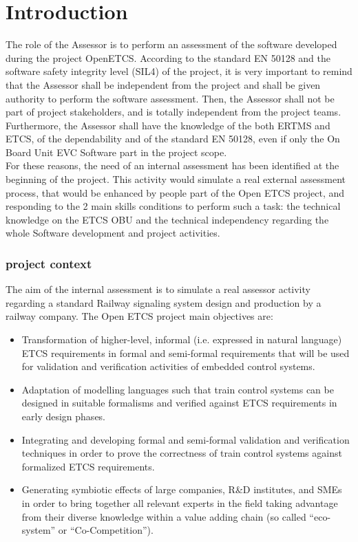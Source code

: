 \documentclass{template/openetcs_report}
\begin{document}

\chapter{Introduction}
The role of the Assessor is to perform an assessment of the software developed during the project OpenETCS. According to the standard EN 50128 and the software safety integrity level (SIL4) of the project, it is very important to remind that the Assessor shall be independent from the project and shall be given authority to perform the software assessment. Then, the Assessor shall not be part of project stakeholders, and is totally independent from the project teams. Furthermore, the Assessor shall have the knowledge of the both ERTMS and ETCS, of the dependability and of the standard EN 50128, even if only the On Board Unit EVC Software part in the project scope.
\\
For these reasons, the need of an internal assessment has been identified at the beginning of the project. This activity would simulate a real external assessment process, that would be  enhanced by people part of the Open ETCS project, and responding to the 2 main skills conditions to perform such a task: the technical knowledge on the ETCS OBU and the technical independency regarding the whole Software development and project activities. 

\subsection{project context}
The aim of the internal assessment is to simulate a real assessor activity regarding a standard Railway signaling system design and production by a railway company. The Open ETCS project main objectives are:
\begin{itemize}
\item Transformation of higher-level, informal (i.e. expressed in natural language) ETCS requirements in formal and semi-formal requirements that will be used for validation and verification activities of embedded control systems.
\item Adaptation of modelling languages such that train control systems can be designed in suitable formalisms and verified against ETCS requirements in early design phases.
\item Integrating and developing formal and semi-formal validation and verification techniques in order to prove the correctness of train control systems against formalized ETCS requirements.
\item Generating symbiotic effects of large companies, R\&D institutes, and SMEs in order to bring together all relevant experts in the field taking advantage from their diverse knowledge within a value adding chain (so called “eco-system” or “Co-Competition”).
\end{itemize}
\end{document}
